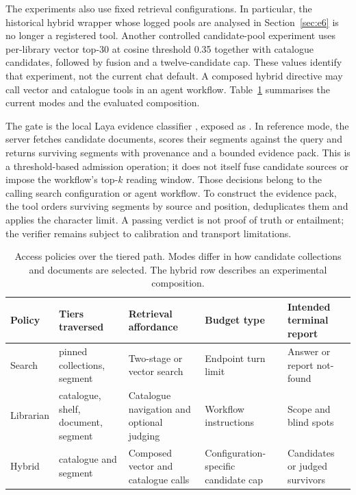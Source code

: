 The experiments also use fixed retrieval configurations. In particular, the
historical hybrid wrapper whose logged pools are analysed in
Section~\ref{sec:e6} is no longer a
registered tool. Another controlled candidate-pool experiment uses per-library
vector top-30 at cosine threshold 0.35 together with catalogue candidates,
followed by fusion and a twelve-candidate cap. These values identify that
experiment, not the current chat default. A composed hybrid directive may call
vector and catalogue tools in an agent workflow. Table~\ref{tab:lanes}
summarises the current modes and the evaluated composition.

The gate is the local Laya evidence classifier \cite{laya}, exposed as
. In reference mode, the server fetches candidate
documents, scores their segments against the query and returns surviving
segments with provenance and a bounded evidence pack. This is a threshold-based
admission operation; it does not itself fuse candidate sources or impose the
workflow's top-$k$ reading window. Those decisions belong to the calling search
configuration or agent workflow. To construct the evidence pack, the tool
orders surviving segments by source and position, deduplicates them and applies
the character limit. A passing verdict
is not proof of truth or entailment; the verifier remains subject to calibration
and transport limitations.

\begin{table}[t]
\centering
\small
\setlength{\tabcolsep}{5pt}
\caption{Access policies over the tiered path. Modes differ in how candidate collections and documents are selected.
The hybrid row describes an experimental composition.}
\label{tab:lanes}
\begin{tabular}{@{}>{\raggedright\arraybackslash}p{}>{\raggedright\arraybackslash}p{}>{\raggedright\arraybackslash}p{}>{\raggedright\arraybackslash}p{}>{\raggedright\arraybackslash}p{}@{}}
\toprule
Policy & Tiers traversed & Retrieval affordance & Budget type & Intended terminal report\\
\midrule
Search & pinned collections, segment & Two-stage or vector search & Endpoint turn limit & Answer or report not-found\\
Librarian & catalogue, shelf, document, segment & Catalogue navigation and optional judging & Workflow instructions & Scope and blind spots\\
Hybrid & catalogue and segment & Composed vector and catalogue calls & Configuration-specific candidate cap & Candidates or judged survivors\\
\bottomrule
\end{tabular}
\end{table}

